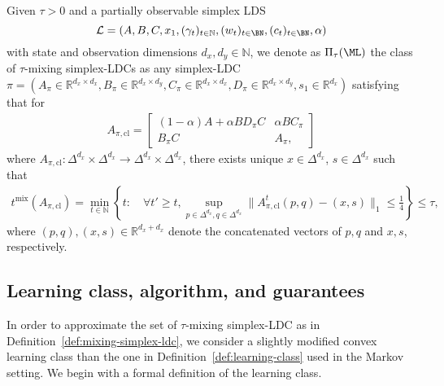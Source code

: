 \begin{definition}
\label{def:mixing-simplex-ldc}
Given $\tau>0$ and a partially observable simplex LDS 
$$\mathcal{L}=(A, B, C, x_1, (\gamma_t)_{t\in\mathbb{N}}, (w_t)_{t\in\BN},(c_t)_{t\in\BN}, \alpha)$$ with state and observation dimensions $d_x, d_y\in\mathbb{N}$, we denote as $\Pi_{\tau}(\ML)$ the class of $\tau$-mixing simplex-LDCs as any simplex-LDC $\pi=(A_{\pi}\in\mathbb{R}^{d_x\times d_x}, B_{\pi}\in\mathbb{R}^{d_x\times d_y}, C_{\pi}\in\mathbb{R}^{d_x\times d_x}, D_{\pi}\in\mathbb{R}^{d_x\times d_y}, s_1\in\mathbb{R}^{d_x})$ satisfying that for
\begin{align}
\label{eq:ldc-transition-matrix}
A_{\pi,\mathrm{cl}}=\begin{bmatrix}
(1-\alpha)A+\alpha BD_{\pi}C & \alpha BC_{\pi} \\
 B_{\pi}C & A_{\pi},
\end{bmatrix}
\end{align}
where $A_{\pi,\mathrm{cl}}:\Delta^{d_x}\times\Delta^{d_x}\rightarrow \Delta^{d_x}\times\Delta^{d_x}$, there exists unique $x\in\Delta^{d_x}$, $s\in\Delta^{d_x}$ such that 
\begin{align*}
t^{\mathrm{mix}}(A_{\pi,\mathrm{cl}})=\min_{t\in\mathbb{N}}\left\{t: \quad \forall t'\ge t, \sup_{p\in\Delta^{d_x},q\in\Delta^{d_x}}\|A_{\pi,\mathrm{cl}}^t(p,q)-(x,s)\|_1\le \frac{1}{4}\right\}\le \tau,
\end{align*}
where $(p,q), (x,s)\in\mathbb{R}^{d_x+d_x}$ denote the concatenated vectors of $p, q$ and $x,s$, respectively.
\end{definition}


\subsection{Learning class, algorithm, and guarantees}

In order to approximate the set of $\tau$-mixing simplex-LDC as in Definition~\ref{def:mixing-simplex-ldc}, we consider a slightly modified convex learning class than the one in Definition~\ref{def:learning-class} used in the Markov setting. We begin with a formal definition of the learning class.

